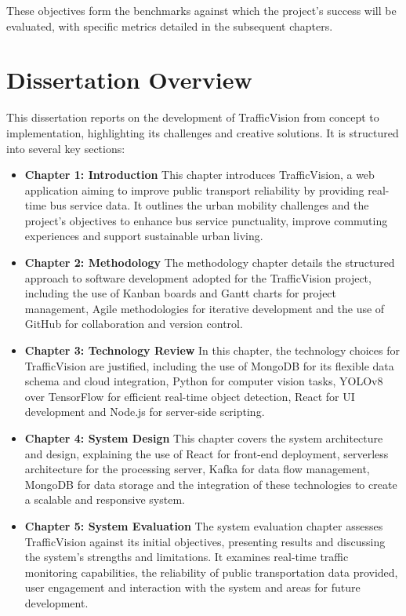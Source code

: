 These objectives form the benchmarks against which the project's success will be evaluated, with specific metrics detailed in the subsequent chapters.

\section{Dissertation Overview}

This dissertation reports on the development of TrafficVision from concept to implementation, highlighting its challenges and creative solutions. It is structured into several key sections:

\begin{itemize}
    \item \textbf{Chapter 1: Introduction} This chapter introduces TrafficVision, a web application aiming to improve public transport reliability by providing real-time bus service data. It outlines the urban mobility challenges and the project’s objectives to enhance bus service punctuality, improve commuting experiences and support sustainable urban living.
    
    \item \textbf{Chapter 2: Methodology} The methodology chapter details the structured approach to software development adopted for the TrafficVision project, including the use of Kanban boards and Gantt charts for project management, Agile methodologies for iterative development and the use of GitHub for collaboration and version control.
    
    \item \textbf{Chapter 3: Technology Review} In this chapter, the technology choices for TrafficVision are justified, including the use of MongoDB for its flexible data schema and cloud integration, Python for computer vision tasks, YOLOv8 over TensorFlow for efficient real-time object detection, React for UI development and Node.js for server-side scripting.

    \item \textbf{Chapter 4: System Design} This chapter covers the system architecture and design, explaining the use of React for front-end deployment, serverless architecture for the processing server, Kafka for data flow management, MongoDB for data storage and the integration of these technologies to create a scalable and responsive system.

    \item \textbf{Chapter 5: System Evaluation} The system evaluation chapter assesses TrafficVision against its initial objectives, presenting results and discussing the system's strengths and limitations. It examines real-time traffic monitoring capabilities, the reliability of public transportation data provided, user engagement and interaction with the system and areas for future development.


\end{itemize}
